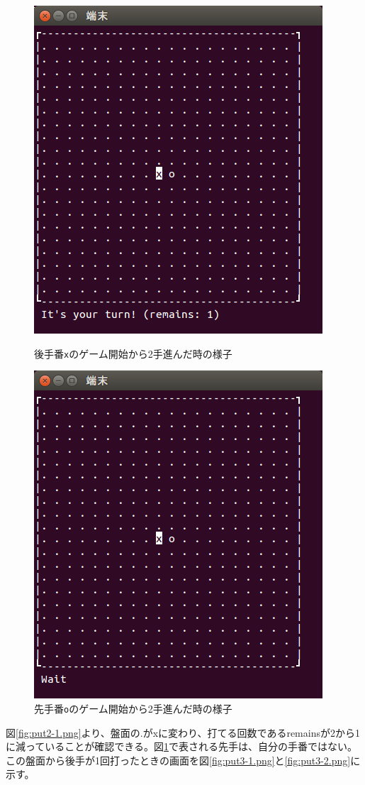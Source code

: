 \documentclass[a4j, titlepage, 10pt]{jsarticle}
\newcommand{\code}[1]{\texttt{#1}}
\begin{document}
\begin{figure}[H]
  \begin{minipage}{0.5\hsize}
    \centering
    \includegraphics[scale=0.5]{img/put2-1.png}
    \caption{後手番\code{x}のゲーム開始から2手進んだ時の様子}
    \label{fig:put2-1.png}
  \end{minipage}
  \begin{minipage}{0.5\hsize}
    \includegraphics[scale=0.5]{img/put2-2.png}
    \caption{先手番\code{o}のゲーム開始から2手進んだ時の様子}
    \label{fig:put2-2.png}
  \end{minipage}
\end{figure}
図\ref{fig:put2-1.png}より、盤面の{\ttfamily .}が{\ttfamily x}に変わり、打てる回数である{\ttfamily remains}が2から1に減っていることが確認できる。図\ref{fig:put2-2.png}で表される先手は、自分の手番ではない。この盤面から後手が1回打ったときの画面を図\ref{fig:put3-1.png}と\ref{fig:put3-2.png}に示す。
\end{document}
